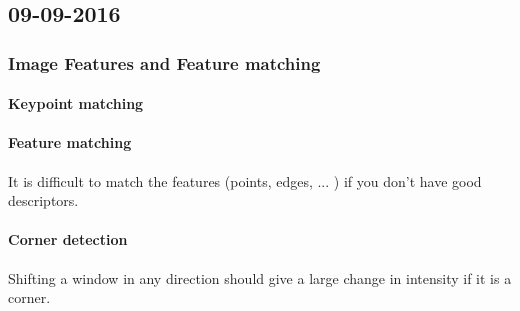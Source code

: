 \subsection{09-09-2016}
\subsubsection{Image Features and Feature matching}
\paragraph{Keypoint matching}

\paragraph{Feature matching} It is difficult to match the features (points, edges, ... ) if you don't have good descriptors.

\paragraph{Corner detection} Shifting a window in any direction should give a large change in intensity if it is a corner.
